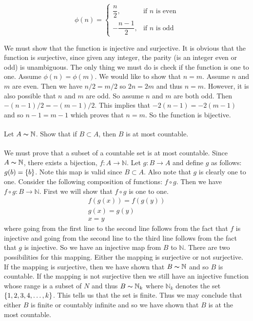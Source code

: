 \documentclass[12pt]{article}
\begin{document}
$$
\phi(n) =
\begin{cases}
\dfrac{n}{2}, & \text{if }n\text{ is even} \\
-\dfrac{n-1}{2}, & \text{if }n\text{ is odd}
\end{cases}
$$


We must show that the function is injective and surjective. It is obvious that the function is surjective, since given any integer, the parity (is an integer even or odd) is unambiguous. The only thing we must do is check if the function is one to one. Assume $\phi(n)=\phi(m)$. We would like to show that $n=m$. Assume $n$ and $m$ are even. Then we have $n/2 = m/2$ so $2n=2m$ and thus $n=m$. However, it is also possible that $n$ and $m$ are odd. So assume $n$ and $m$ are both odd. Then $-(n-1)/2=-(m-1)/2$. This implies that $-2(n-1)=-2(m-1)$ and so $n-1=m-1$ which proves that $n=m$. So the function is bijective. \\ \\ 

\problem Let $A \thicksim \mathbb{N}$. Show that if $B \subset A$, then $B$ is at most countable. \\ \\ 

We must prove that a subset of a countable set is at most countable. Since $A \thicksim \mathbb{N}$, there exists a bijection, $f: A \rightarrow \mathbb{N}$. Let $g: B \rightarrow A$ and define $g$ as follows: $g(b)= \left\{b\right\}$. Note this map is valid since $B \subset A$. Also note that $g$ is clearly one to one. Consider the following composition of functions: $f \circ g$. Then we have $f \circ g: B \rightarrow \mathbb{N}$. First we will show that $f \circ g$ is one to one. \\ 
\begin{align*}
f(g(x))=f(g(y)) \\
g(x)=g(y) \\ 
x=y
\end{align*}
where going from the first line to the second line follows from the fact that $f$ is injective and going from the second line to the third line follows from the fact that $g$ is injective. So we have an injective map from $B$ to $\mathbb{N}$. There are two possibilities for this mapping. Either the mapping is surjective or not surjective. If the mapping is surjective, then we have shown that $B \thicksim \mathbb{N}$ and so $B$ is countable. If the mapping is not surjective then we still have an injective function whose range is a subset of $N$ and thus $B \thicksim \mathbb{N}_{k}$ where $\mathbb{N} _{k}$ denotes the set $\left\{1,2,3,4, \ldots, k\right\}$. This tells us that the set is finite. Thus we may conclude that either $B$ is finite or countably infinite and so we have shown that $B$ is at the most countable. \\ \\
\end{document}
